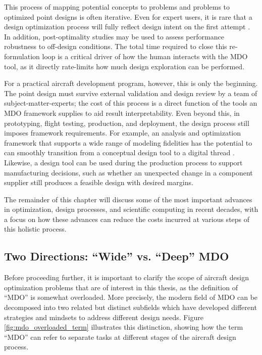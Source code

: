 This process of mapping potential concepts to problems and problems to optimized point designs is often iterative. Even for expert users, it is rare that a design optimization process will fully reflect design intent on the first attempt \cite{drela_pros_1998}. In addition, post-optimality studies may be used to assess performance robustness to off-design conditions. The total time required to close this re-formulation loop is a critical driver of how the human interacts with the MDO tool, as it directly rate-limits how much design exploration can be performed.

For a practical aircraft development program, however, this is only the beginning. The point design must survive external validation and design review by a team of subject-matter-experts; the cost of this process is a direct function of the tools an MDO framework supplies to aid result interpretability. Even beyond this, in prototyping, flight testing, production, and deployment, the design process still imposes framework requirements. For example, an analysis and optimization framework that supports a wide range of modeling fidelities has the potential to can smoothly transition from a conceptual design tool to a digital thread \cite{niederer_scaling_2021, singh_engineering_2018}. Likewise, a design tool can be used during the production process to support manufacturing decisions, such as whether an unexpected change in a component supplier still produces a feasible design with desired margins.

The remainder of this chapter will discuss some of the most important advances in optimization, design processes, and scientific computing in recent decades, with a focus on how these advances can reduce the costs incurred at various steps of this holistic process.

\subsection{Two Directions: ``Wide'' vs. ``Deep'' MDO}
\label{sec:wide_vs_deep}

Before proceeding further, it is important to clarify the scope of aircraft design optimization problems that are of interest in this thesis, as the definition of ``MDO'' is somewhat overloaded. More precisely, the modern field of MDO can be decomposed into two related but distinct subfields which have developed different strategies and mindsets to address different design needs. Figure \ref{fig:mdo_overloaded_term} illustrates this distinction, showing how the term ``MDO'' can refer to separate tasks at different stages of the aircraft design process.

